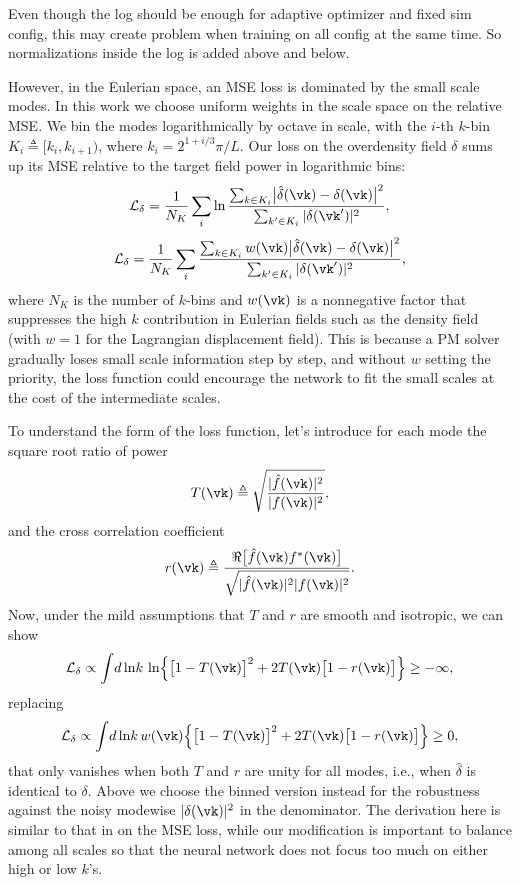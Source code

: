 \documentclass[modern, trackchanges, dvipsnames]{aastex631}
\renewcommand{\d}{d}
\newcommand{\cL}{\mathcal{L}}
\newcommand{\YL}[1]{\textcolor{Bittersweet}{#1}}
\begin{document}
\YL{Even though the log should be enough for adaptive optimizer and
fixed sim config, this may create problem when training on all config at
the same time. So normalizations inside the log is added above and
below.}

However, in the Eulerian space, an MSE loss is dominated by the small
scale modes.
In this work we choose uniform weights in the scale space on the
relative MSE.
We bin the modes logarithmically by  octave in scale, with
the $i$-th $k$-bin $K_i \triangleq [k_i, k_{i+1})$, where $k_i =
2^{1+i/3} \pi / L$.
Our loss on the overdensity field $\delta$ sums up its MSE relative to
the target field power in logarithmic bins:
%
\begin{equation}
\cL_\delta = \frac1{N_K} \sum_i \ln
\frac{\sum_{k \in K_i} \bigl| \hat\delta(\vk) - \delta(\vk) \bigr|^2}
     {\sum_{k' \in K_i} |\delta(\vk')|^2},
\end{equation}
%
\begin{equation}
\cL_\delta = \frac1{N_K} \sum_i
\frac{\sum_{k \in K_i} w(\vk)
      \bigl| \hat\delta(\vk) - \delta(\vk) \bigr|^2}
     {\sum_{k' \in K_i} |\delta(\vk')|^2},
\end{equation}
%
where $N_K$ is the number of $k$-bins and $w(\vk)$ is a nonnegative
factor that suppresses the high $k$ contribution in Eulerian fields such
as the density field (with $w=1$ for the Lagrangian displacement field).
This is because a PM solver gradually loses small scale information step
by step, and without $w$ setting the priority, the loss function could
encourage the network to fit the small scales at the cost of the
intermediate scales.

To understand the form of the loss function, let's introduce for each
mode the square root ratio of power
%
\begin{equation}
T(\vk) \triangleq
\sqrt{\frac{|\hat f(\vk)|^2}{|f(\vk)|^2}},
\end{equation}
%
and the cross correlation coefficient
%
\begin{equation}
r(\vk) \triangleq
\frac{\Re \bigl[ \hat f(\vk) f^*(\vk) \bigr]}
     {\sqrt{|\hat f(\vk)|^2 |f(\vk)|^2}}.
\end{equation}
%
Now, under the mild assumptions that $T$ and $r$ are smooth and
isotropic, we can show
%
\begin{equation}
\cL_\delta \propto \int \!\d\ln\!k\, \ln
\Bigl\{ \bigl[ 1 - T(\vk) \bigr]^2
  + 2 T(\vk) \bigl[ 1 - r(\vk) \bigr] \Bigr\} \geq -\infty,
\end{equation}
%
replacing
%
\begin{equation}
\cL_\delta \propto \int \!\d\ln\!k\, w(\vk)
\Bigl\{ \bigl[ 1 - T(\vk) \bigr]^2
  + 2 T(\vk) \bigl[ 1 - r(\vk) \bigr] \Bigr\} \geq 0,
\end{equation}
%
that only vanishes when both $T$ and $r$ are unity for all modes, i.e.,
when $\hat\delta$ is identical to $\delta$.
Above we choose the binned version instead for the robustness against
the noisy modewise $|\delta(\vk)|^2$ in the denominator.
The derivation here is similar to that in \citet{HeEtAl2019} on the MSE
loss, while our modification is important to balance among all scales so
that the neural network does not focus too much on either high or low
$k$'s.
\end{document}
